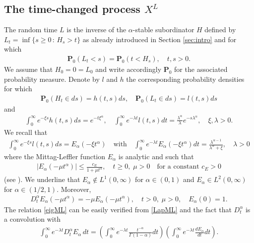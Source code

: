 \documentclass[11pt,a4paper]{article}
\begin{document}
\subsection{The time-changed process $X^L$}
\label{sec:secXL}

The random time $L$ is the inverse of the $\alpha$-stable subordinator $H$ defined by $L_t = \inf\{s\geq 0\,:\, H_s>t \}$ as already introduced in Section \ref{sec:intro} and for which 
\begin{align}
\mathbf{P}_0(L_t < s) = \mathbf{P}_0(t < H_s), \quad t,s>0.
\label{probLprobH}
\end{align}
We assume that $H_0=0=L_0$ and write accordingly $\mathbf{P}_0$ for the associated probability measure. Denote by $l$ and $h$ the corresponding probability densities for which
\begin{align*}
\mathbf{P}_0(H_t \in ds) = h(t,s)ds, \quad \mathbf{P}_0(L_t \in ds) = l(t,s)ds
\end{align*}
and 
\begin{align}
\label{LapHandL}
\int_0^\infty e^{-\xi s} h(t,s) ds = e^{-t \xi^\alpha}, \quad \int_0^\infty e^{-\lambda t} l(t,s)dt = \frac{\lambda^\alpha}{\lambda} e^{-s \lambda^\alpha}, \quad \xi, \lambda>0.
\end{align}
We recall that
\begin{align}
\label{LapML}
\int_0^\infty e^{-\xi s} l(t,s) ds = E_\alpha(- \xi t^\alpha) \quad \textrm{with} \quad \int_0^\infty e^{-\lambda t} E_\alpha (-\xi t^\alpha) dt = \frac{\lambda^{\alpha-1}}{\lambda^\alpha + \xi}, \quad \lambda>0
\end{align}
where the Mittag-Leffler function $E_\alpha$ is analytic and such that
\begin{align}
\label{MLbound}
| E_\alpha(-\mu t^\alpha)| \leq \frac{c_E}{1+ \mu t^\alpha}, \quad t\geq 0, \; \mu>0 \quad \textrm{for a constant } c_E>0 
\end{align}
(see \cite{Bingham71, Kra03}). We underline that $E_\alpha \notin L^1(0, \infty)$ for $\alpha \in (0,1)$ and $E_\alpha \in L^2(0, \infty)$ for $\alpha \in (1/2,1)$. Moreover,
\begin{align}
\label{eigML}
D^\alpha_t E_\alpha(-\mu t^\alpha) = - \mu E_\alpha(-\mu t^\alpha), \quad t>0,\; \mu >0, \quad E_\alpha(0)=1.
\end{align}
The relation \eqref{eigML} can be easily verified from \eqref{LapML} and the fact that $D^\alpha_t$ is a convolution with
\begin{align*}
\int_0^\infty e^{-\lambda t} D^\alpha_t E_\alpha\, dt = \left( \int_0^\infty e^{-\lambda t} \frac{t^{-\alpha}}{\Gamma(1-\alpha)} dt \right) \left(\int_0^\infty e^{-\lambda t} \frac{d E_\alpha}{dt} dt \right).
\end{align*}
\end{document}
